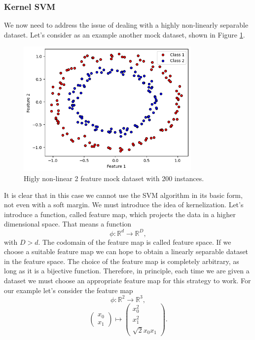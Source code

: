 \documentclass[12pt]{article}
\begin{document}
\subsubsection{Kernel SVM}
We now need to address the issue of dealing with a highly non-linearly separable dataset. Let's consider as an example another mock dataset, shown in Figure \ref{fig:classical svm circles}. 
\begin{figure}[h!]
    \centering
    \includegraphics[width=0.8\textwidth]{images/circles.png}
    \caption{Higly non-linear 2 feature mock dataset with 200 instances.}
    \label{fig:classical svm circles}
\end{figure}
It is clear that in this case we cannot use the SVM algorithm in its basic form, not even with a soft margin. We must introduce the idea of kernelization. 
Let's introduce a function, called feature map, which projects the data in a higher dimensional space. That means a function
\begin{equation}
    \phi:\mathbb{R}^d\rightarrow\mathbb{R}^D,
\end{equation}
with $D>d$. The codomain of the feature map is called feature space. If we choose a suitable feature map we can hope to obtain a linearly separable dataset in the feature space. The choice of the feature map is completely arbitrary, as long as it is a bijective function. Therefore, in principle, each time we are given a dataset we must choose an appropriate feature map for this strategy to work. For our example let's consider the feature map
$$    \phi:\mathbb{R}^2\rightarrow\mathbb{R}^3,$$
\begin{equation}
    \begin{pmatrix}
        x_0\\
        x_1
        \end{pmatrix} \mapsto  
        \begin{pmatrix}
        x_0^2 \\
        x_1^2\\
        \sqrt{2}x_0x_1
        \end{pmatrix} .
\end{equation}
\end{document}
